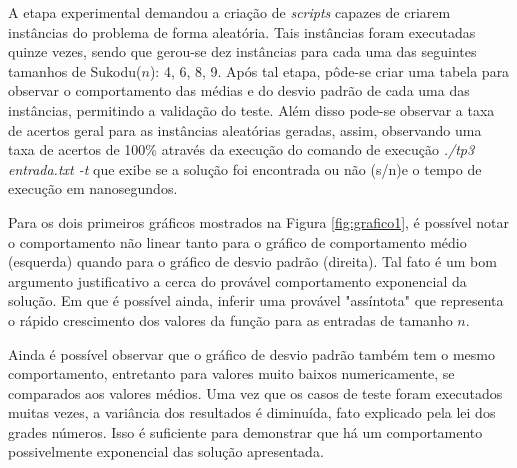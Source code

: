 A etapa experimental demandou a criação de \textit{scripts} capazes de criarem instâncias do problema de forma aleatória. Tais instâncias foram executadas quinze vezes, sendo que gerou-se dez instâncias para cada uma das seguintes tamanhos de Sukodu($n$): 4, 6, 8, 9. Após tal etapa, pôde-se criar uma tabela para observar o comportamento das médias e do desvio padrão de cada uma das instâncias, permitindo a validação do teste. Além disso pode-se observar a taxa de acertos geral para as instâncias aleatórias geradas, assim, observando uma taxa de acertos de 100\% através da execução do comando de execução \textit{./tp3 entrada.txt -t} que exibe se a solução foi encontrada ou não (s/n)e o tempo de execução em nanosegundos.

Para os dois primeiros gráficos mostrados na Figura \ref{fig:grafico1}, é possível notar o comportamento não linear tanto para o gráfico de comportamento médio (esquerda) quando para o gráfico de desvio padrão (direita). Tal fato é um bom argumento justificativo a cerca do provável comportamento exponencial da solução. Em que é possível ainda, inferir uma provável "assíntota" que representa o rápido crescimento dos valores da função para as entradas de tamanho $n$.


Ainda é possível observar que o gráfico de desvio padrão também tem o mesmo comportamento, entretanto para valores muito baixos numericamente, se comparados aos valores médios. Uma vez que os casos de teste foram executados muitas vezes, a variância dos resultados é diminuída, fato explicado pela lei dos grades números. Isso é suficiente para demonstrar que há um comportamento possivelmente exponencial das solução apresentada.